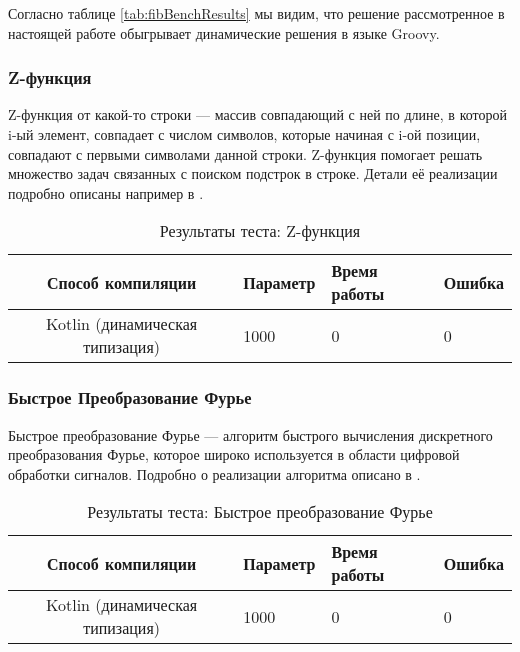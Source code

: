 Согласно таблице \ref{tab:fibBenchResults} мы видим, что решение рассмотренное в настоящей работе обыгрывает динамические решения в языке Groovy.

\subsubsection{Z-функция}


Z-функция от какой-то строки --- массив совпадающий с ней по длине, в которой i-ый элемент, совпадает с числом символов, которые начиная с i-ой позиции, совпадают с первыми символами данной строки. Z-функция помогает решать множество задач связанных с поиском подстрок в строке.
Детали её реализации подробно описаны например в \cite{algo:gusfield1997algorithms}.

\begin{table}[h]
\caption{\label{tab:zFunctionBenchResults}Результаты теста: Z-функция}
\begin{center}
\begin{tabular}{|c|l|l|l|}
\hline
Способ компиляции & Параметр	& Время работы & Ошибка \\
\hline
Kotlin (динамическая типизация) & 1000 & 0 & 0 \\
\hline
\end{tabular}
\end{center}
\end{table} 

\subsubsection{Быстрое Преобразование Фурье}

Быстрое преобразование Фурье --- алгоритм быстрого вычисления дискретного преобразования Фурье, которое широко используется в области цифровой обработки сигналов. Подробно о реализации алгоритма описано в \cite{algo:dasgypta2014algo}.

\begin{table}[h]
\caption{\label{tab:fftResults}Результаты теста: Быстрое преобразование Фурье}
\begin{center}
\begin{tabular}{|c|l|l|l|}
\hline
Способ компиляции & Параметр	& Время работы & Ошибка \\
\hline
Kotlin (динамическая типизация) & 1000 & 0 & 0 \\
\hline
\end{tabular}
\end{center}
\end{table} 